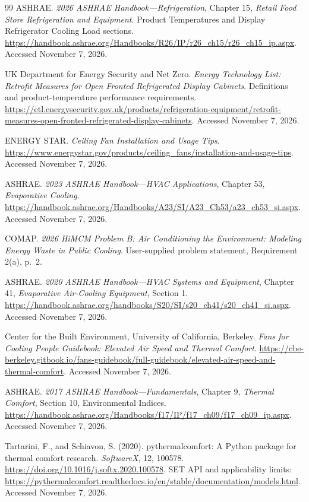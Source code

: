 \documentclass[12pt]{article}
\begin{document}
\clearpage
{}
{}
\begin{thebibliography}{99}
ASHRAE. \emph{2026 ASHRAE Handbook---Refrigeration},
Chapter 15, \emph{Retail Food Store Refrigeration and Equipment}.
Product Temperatures and Display Refrigerator Cooling Load sections.
\url{https://handbook.ashrae.org/Handbooks/R26/IP/r26_ch15/r26_ch15_ip.aspx}.
Accessed November 7, 2026.

UK Department for Energy Security and Net Zero.
\emph{Energy Technology List: Retrofit Measures for Open Fronted Refrigerated Display Cabinets}.
Definitions and product-temperature performance requirements.
\url{https://etl.energysecurity.gov.uk/products/refrigeration-equipment/retrofit-measures-open-fronted-refrigerated-display-cabinets}.
Accessed November 7, 2026.

ENERGY STAR. \emph{Ceiling Fan Installation and Usage Tips}.
\url{https://www.energystar.gov/products/ceiling_fans/installation-and-usage-tips}.
Accessed November 7, 2026.

ASHRAE. \emph{2023 ASHRAE Handbook---HVAC Applications},
Chapter 53, \emph{Evaporative Cooling}.
\url{https://handbook.ashrae.org/Handbooks/A23/SI/A23_Ch53/a23_ch53_si.aspx}.
Accessed November 7, 2026.

COMAP. \emph{2026 HiMCM Problem B: Air Conditioning the Environment: Modeling Energy Waste in Public Cooling}.
User-supplied problem statement, Requirement 2(a), p.~2.

ASHRAE. \emph{2020 ASHRAE Handbook---HVAC Systems and Equipment},
Chapter 41, \emph{Evaporative Air-Cooling Equipment}, Section 1.
\url{https://handbook.ashrae.org/handbooks/S20/SI/s20_ch41/s20_ch41_si.aspx}.
Accessed November 7, 2026.

Center for the Built Environment, University of California, Berkeley.
\emph{Fans for Cooling People Guidebook: Elevated Air Speed and Thermal Comfort}.
\url{https://cbe-berkeley.gitbook.io/fans-guidebook/full-guidebook/elevated-air-speed-and-thermal-comfort}.
Accessed November 7, 2026.

ASHRAE. \emph{2017 ASHRAE Handbook---Fundamentals},
Chapter 9, \emph{Thermal Comfort}, Section 10, Environmental Indices.
\url{https://handbook.ashrae.org/Handbooks/f17/IP/f17_ch09/f17_ch09_ip.aspx}.
Accessed November 7, 2026.

Tartarini, F., and Schiavon, S. (2020).
pythermalcomfort: A Python package for thermal comfort research.
\emph{SoftwareX}, 12, 100578.
\url{https://doi.org/10.1016/j.softx.2020.100578}.
SET API and applicability limits:
\url{https://pythermalcomfort.readthedocs.io/en/stable/documentation/models.html}.
Accessed November 7, 2026.


\end{thebibliography}
\end{document}

